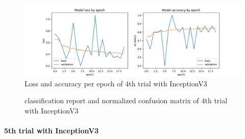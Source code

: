 \documentclass{article}
\begin{document}
\begin{figure}%
    \centering
    \includegraphics[width=1.0\linewidth]{inceptionv3_07_loss_accuracy.png}
    \caption{Loss and accuracy per epoch of 4th trial with InceptionV3}
    \label{fig:inceptionv3_07_loss_accuracy}
\end{figure}

\begin{figure}%
  \centering
  \qquad
  \caption{classification report and normalized confusion matrix of 4th trial with InceptionV3}
  \label{fig:inceptionv3_07_results}
\end{figure}

\paragraph{5th trial with InceptionV3}\mbox{}\\
\end{document}
